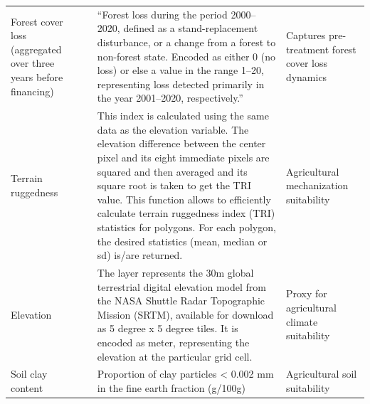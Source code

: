 \documentclass{article}
\begin{document}
\begin{table}[h]
\begin{tabular}{L{2cm}L{2cm}L{9cm}L{3cm}}
Forest cover loss (aggregated over three years before financing) & \cite{hansen2013high}                         & ``Forest loss during the period 2000--2020, defined as a stand-replacement disturbance, or a change from a forest to non-forest state. Encoded as either 0 (no loss) or else a value in the range 1--20, representing loss detected primarily in the year 2001--2020, respectively.''                                                                                                                                                & Captures pre-treatment forest cover loss dynamics                                                \\
Terrain ruggedness                                                     & \cite{farr2007shuttle, riley1999index} & This index is calculated using the same data as the elevation variable. The elevation difference between the center pixel and its eight immediate pixels are squared and then averaged and its square root is taken to get the TRI value. This function allows to efficiently calculate terrain ruggedness index (TRI) statistics for polygons. For each polygon, the desired statistics (mean, median or sd) is/are returned. & Agricultural mechanization suitability                                                       \\
Elevation                                                              & \cite{farr2007shuttle}                        & The layer represents the 30m global terrestrial digital elevation model from the NASA Shuttle Radar Topographic Mission (SRTM), available for download as 5 degree x 5 degree tiles. It is encoded as meter, representing the elevation at the particular grid cell.                                                                                                                                                            & Proxy for agricultural climate suitability                                                   \\
Soil clay content                                                      & \cite{hengl2017soilgrids250m}                  & Proportion of clay particles < 0.002 mm in the fine earth fraction (g/100g)                                                                                                                                                                                                                                                                                                                                                     & Agricultural soil suitability                                                                \\

\end{tabular}
\end{table}
\end{document}
